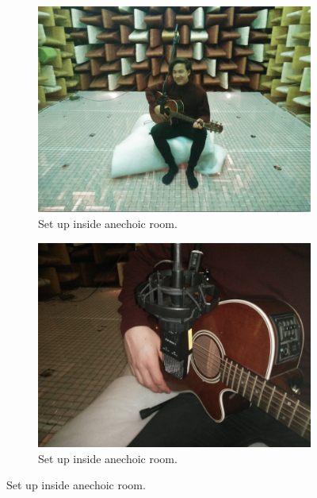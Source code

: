 \begin{figure}[H]
\centering
	\begin{subfigure}{0.49\textwidth}
    \includegraphics[scale=0.22]{figures/recording/setup1.png}
	\caption{Set up inside anechoic room.}
    \label{fig:setup1}    
    \end{subfigure}
    \begin{subfigure}{0.49\textwidth}
    \includegraphics[scale=0.22]{figures/recording/setup2.png}
    \caption{Set up inside anechoic room.}
    \label{fig:setup2}
    \end{subfigure}
\end{figure} 

